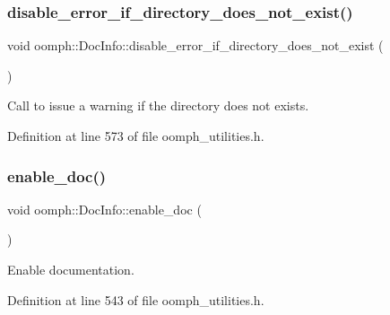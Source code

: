 \subsubsection{\texorpdfstring{disable\+\_\+error\+\_\+if\+\_\+directory\+\_\+does\+\_\+not\+\_\+exist()}{disable\_error\_if\_directory\_does\_not\_exist()}}
{\footnotesize\ttfamily void oomph\+::\+Doc\+Info\+::disable\+\_\+error\+\_\+if\+\_\+directory\+\_\+does\+\_\+not\+\_\+exist (\begin{DoxyParamCaption}{ }\end{DoxyParamCaption})\hspace{0.3cm}{\ttfamily [inline]}}



Call to issue a warning if the directory does not exists. 



Definition at line 573 of file oomph\+\_\+utilities.\+h.

\mbox{\label{classoomph_1_1DocInfo_a1a7842518e86de0f08d8dc130bee9376}} 
\subsubsection{\texorpdfstring{enable\+\_\+doc()}{enable\_doc()}}
{\footnotesize\ttfamily void oomph\+::\+Doc\+Info\+::enable\+\_\+doc (\begin{DoxyParamCaption}{ }\end{DoxyParamCaption})\hspace{0.3cm}{\ttfamily [inline]}}



Enable documentation. 



Definition at line 543 of file oomph\+\_\+utilities.\+h.

\mbox{\label{classoomph_1_1DocInfo_aaf51ae312c8e7726ddf1888f37f44433}} 
